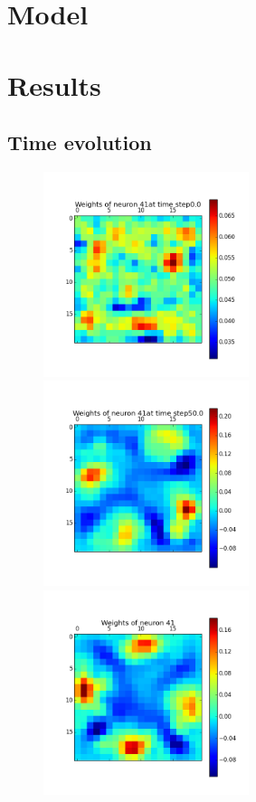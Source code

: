 \documentclass[a4paper, 12pt]{article}
\begin{document}
\section{Model}
%


%
%
%
\section{Results}
%


\subsection{Time evolution}
\begin{figure}[htbp]
\begin{minipage}[hbt]{0,49\textwidth}
        \centering
\includegraphics[width=6cm,height=6cm]{neurons/neuron_w_41_t_0.png}\\[10pt]
\includegraphics[width=6cm,height=6cm]{neurons/neuron_w_41_t_50.png} \\[10pt]
\includegraphics[width=6cm,height=6cm]{neurons/neuron_w_41.png}

\end{minipage}
\end{figure}
\end{document}
